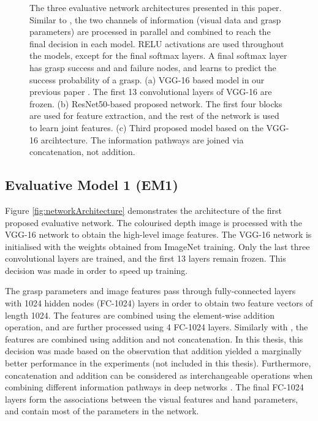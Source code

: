 \begin{figure}[t]
\caption{The three evaluative network architectures presented in this paper. Similar to \cite{Levine1}, the two channels of information (visual data and grasp parameters) are processed in parallel and combined to reach the final decision in each model. RELU activations are used throughout the models, except for the final softmax layers. A final softmax layer has grasp success and and failure nodes, and learns to predict the success probability of a grasp. (a) VGG-16 based model in our previous paper \cite{icra}. The first 13 convolutional layers of VGG-16 are frozen. (b) ResNet50-based \cite{resnet} proposed network. The first four blocks are used for feature extraction, and the rest of the network is used to learn joint features. (c) Third proposed model based on the VGG-16 arcihtecture. The information pathways are joined via concatenation, not addition.}

\label{fig:networkArchitecture2}
\end{figure}

\subsection{Evaluative Model 1 (EM1)}

Figure \ref{fig:networkArchitecture} demonstrates the architecture of the first proposed evaluative network. The colourised depth image is processed with the VGG-16 network \cite{Simonyan14c} to obtain the high-level image features. The VGG-16 network is initialised with the weights obtained from ImageNet training. Only the last three convolutional layers are trained, and the first 13 layers remain frozen. This decision was made in order to speed up training.

The grasp parameters and image features pass through fully-connected layers with 1024 hidden nodes (FC-1024) layers in order to obtain two feature vectors of length 1024. The features are combined using the element-wise addition operation, and are further processed using 4 FC-1024 layers. Similarly with \cite{Levine1}, the features are combined using addition and not concatenation. In this thesis, this decision was made based on the observation that addition yielded a marginally better performance in the experiments (not included in this thesis). Furthermore, concatenation and addition can be considered as interchangeable operations when combining different information pathways in deep networks \cite{dumoulin2018feature-wise}. The final FC-1024 layers form the associations between the visual features and hand parameters, and contain most of the parameters in the network. 


